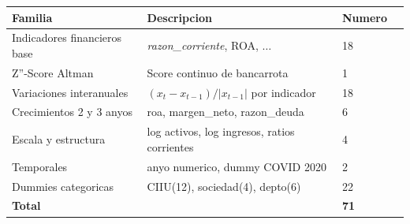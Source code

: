 \begin{tabular}{lll r}
\hline
Familia & Descripcion & Numero \\
\hline
Indicadores financieros base & \textit{razon\_corriente}, ROA, $\ldots$ & 18 \\
Z''-Score Altman & Score continuo de bancarrota & 1 \\
Variaciones interanuales & $(x_t - x_{t-1}) / |x_{t-1}|$ por indicador & 18 \\
Crecimientos 2 y 3 anyos & roa, margen\_neto, razon\_deuda & 6 \\
Escala y estructura & log activos, log ingresos, ratios corrientes & 4 \\
Temporales & anyo numerico, dummy COVID 2020 & 2 \\
Dummies categoricas & CIIU(12), sociedad(4), depto(6) & 22 \\
\hline
\textbf{Total} & & \textbf{71} \\
\hline
\end{tabular}